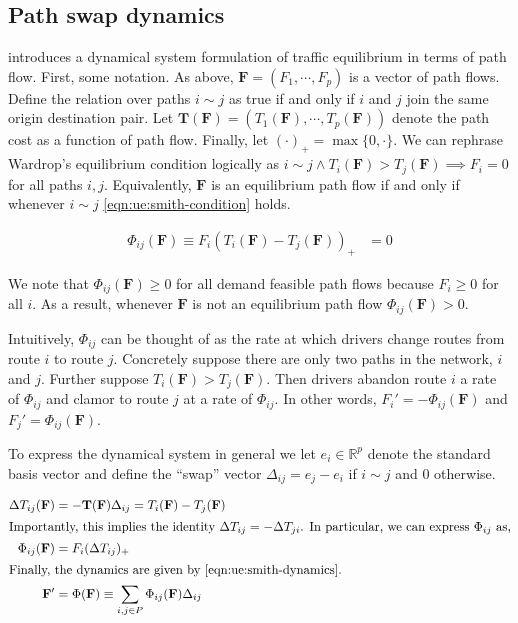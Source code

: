 \subsection{Path swap dynamics}

\citet{smith1984stability} introduces a dynamical system formulation of traffic equilibrium in terms of path flow.
First, some notation. As above, $\mathbf{F}=(F_1, \cdots, F_p)$ is a vector of path flows.
Define the relation over paths $i\sim j$ as true if and only if $i$ and $j$ join the same origin destination pair.
Let $\mathbf{T}(\mathbf{F})=(T_1(\mathbf{F}), \cdots, T_p(\mathbf{F}))$ denote the path cost as a function of path flow.
Finally, let $(\cdot)_+=\max\{0, \cdot\}$.
We can rephrase Wardrop's equilibrium condition logically as $ i \sim j \land T_i(\mathbf{F}) > T_j(\mathbf{F}) \implies F_i = 0$ for all paths $i, j$.
Equivalently, $\mathbf{F}$ is an equilibrium path flow if and only if whenever $i\sim j$ \eqref{eqn:ue:smith-condition} holds.

\begin{align}
    \Phi_{ij}(\mathbf{F}) \equiv F_i(T_i(\mathbf{F}) - T_j(\mathbf{F}))_+ &= 0\label{eqn:ue:smith-condition}
\end{align}

We note that $\Phi_{ij}(\mathbf{F}) \geq 0$ for all demand feasible path flows because $F_i\geq 0$ for all $i$.
As a result, whenever $\mathbf{F}$ is not an equilibrium path flow $\Phi_{ij}(\mathbf{F}) > 0$.

Intuitively, $\Phi_{ij}$ can be thought of as the rate at which drivers change routes from route $i$ to route $j$.
Concretely suppose there are only two paths in the network, $i$ and $j$.
Further suppose $T_i(\mathbf{F}) > T_j(\mathbf{F})$.
Then drivers abandon route $i$ a rate of $\Phi_{ij}$ and clamor to route $j$ at a rate of $\Phi_{ij}$.
In other words, $F_i' = -\Phi_{ij}(\mathbf{F})$ and $F_j' = \Phi_{ij}(\mathbf{F})$.

To express the dynamical system in general we let $e_i\in \mathbb{R}^p$ denote the standard basis vector and define the ``swap'' vector $\Delta_{ij} = e_j - e_i$ if $i \sim j$ and $0$ otherwise.

\begin{align}
    \Delta T_{ij}(\mathbf{F}) &= -\mathbf{T}(\mathbf{F})\Delta_{ij} = T_i(\mathbf{F}) - T_j(\mathbf{F})\\
    \intertext{Importantly, this implies the identity $\Delta T_{ij} = -\Delta T_{ji}$. In particular, we can express $\Phi_{ij}$ as,}
    \Phi_{ij}(\mathbf{F}) &= F_i (\Delta T_{ij})_+\\
    \intertext{Finally, the dynamics are given by \eqref{eqn:ue:smith-dynamics}.}
    \mathbf{F}' &= \Phi(\mathbf{F}) \equiv \sum_{i, j\in P} \Phi_{ij}(\mathbf{F})\Delta_{ij} \label{eqn:ue:smith-dynamics}
\end{align}

